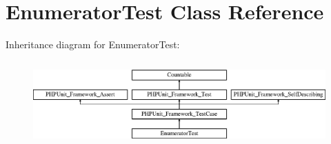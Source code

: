 \hypertarget{class_sebastian_bergmann_1_1_object_enumerator_1_1_enumerator_test}{}\section{Enumerator\+Test Class Reference}
\label{class_sebastian_bergmann_1_1_object_enumerator_1_1_enumerator_test}
Inheritance diagram for Enumerator\+Test\+:\begin{figure}[H]
\begin{center}
\leavevmode
\includegraphics[height=3.303835cm]{class_sebastian_bergmann_1_1_object_enumerator_1_1_enumerator_test}
\end{center}
\end{figure}
